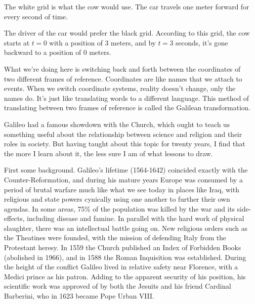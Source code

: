 The white grid is what the cow would use.
The car travels one meter
forward for every second of time.

The driver of the car would prefer the black grid. According to this grid, the cow starts at $t=0$
with a position of 3 meters, and by $t=3$ seconds, it's gone backward to a position of 0 meters.

What we're doing here is switching back and forth between the coordinates of two different frames
of reference. Coordinates are like names that we attach to events. When we switch coordinate systems,
reality doesn't change, only the names do. It's just like translating words to a different language.
This method of translating between two frames of reference is called the Galilean transformation.

\pagebreak


Galileo had a famous showdown with the Church, which ought to teach us something useful about
the relationship between science and religion and their roles in society. But having taught
about this topic for twenty years, I find that the more I learn about it, the less sure I am
of what lessons to draw.

First some background. Galileo's lifetime (1564-1642) coincided exactly
with the Counter-Reformation, and during his mature years Europe was consumed by a period
of brutal warfare much like what we see today in places like Iraq, with religious and state
powers cynically using one another to further their own agendas. In some areas, 75\% of
the population was killed by the war and its side-effects, including disease and famine.
In parallel with the hard work of physical slaughter, there was an intellectual battle going on.
New religious orders such as the Theatines were founded, with the mission of defending Italy from
the Protestant heresy. In 1559 the Church published an
Index of Forbidden Books (abolished in 1966), and in 1588 the Roman Inquisition was established.
During the height of the conflict Galileo lived in relative safety near Florence, with a Medici prince as his patron.
Adding to the apparent security of his position, his scientific work was approved of by both
the Jesuits and his friend Cardinal Barberini, who in 1623 became Pope Urban VIII.

